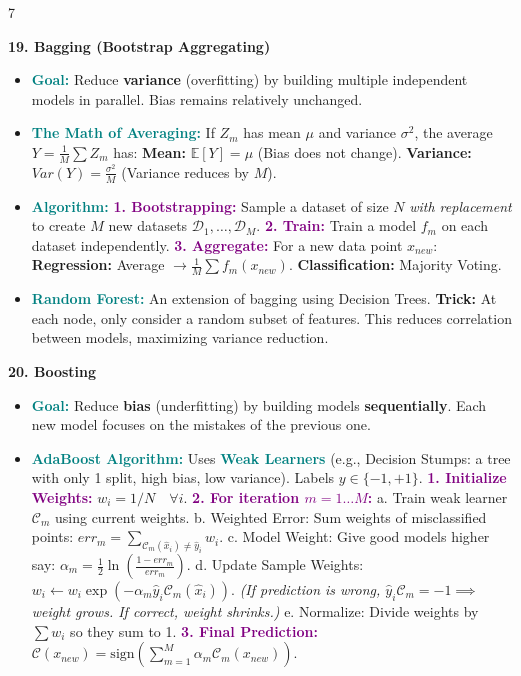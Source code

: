 \documentclass{article}
\newcommand{\hlhighlight}[1]{\par\vspace{1.5pt}\noindent\colorbox{yellow!50}{\parbox{\dimexpr\columnwidth-2\fboxsep\relax}{\textbf{#1}}}\par\vspace{0.5pt}}
\newcommand{\sectitle}[1]{\par\textbf{\color{blue!70!black}{#1}}\par}
\newcommand{\concept}[1]{\textcolor{teal}{\textbf{#1}}}
\newcommand{\procname}[1]{\textcolor{purple}{\textbf{#1}}}
\newcommand{\lbl}[1]{\textcolor{green!60!black}{\textbf{#1}}}
\newcommand{\lblnb}[1]{\textcolor{green!60!black}{#1}}
\begin{document}
\begin{multicols}{7}
\hlhighlight{19. Bagging (Bootstrap Aggregating)}
\sectitle{Averaging \& Algorithms}
\begin{itemize}
    \item \concept{Goal:} Reduce \lbl{variance} (overfitting) by building multiple independent models in parallel. Bias remains relatively unchanged.
    \item \concept{The Math of Averaging:} If $Z_m$ has mean $\mu$ and variance $\sigma^2$, the average $Y = \frac{1}{M}\sum Z_m$ has: \lbl{Mean:} $\mathbb{E}[Y] = \mu$ (Bias does not change). \lbl{Variance:} $Var(Y) = \frac{\sigma^2}{M}$ (Variance reduces by $M$).
    \item \concept{Algorithm:} \procname{1. Bootstrapping:} Sample a dataset of size $N$ \textit{with replacement} to create $M$ new datasets $\mathcal{D}_1, \dots, \mathcal{D}_M$. \procname{2. Train:} Train a model $f_m$ on each dataset independently. \procname{3. Aggregate:} For a new data point $x_{new}$: \lbl{Regression:} Average $\rightarrow \frac{1}{M}\sum f_m(x_{new})$. \lbl{Classification:} Majority Voting.
    \item \concept{Random Forest:} An extension of bagging using Decision Trees. \lbl{Trick:} At each node, only consider a random subset of features. This reduces correlation between models, maximizing variance reduction.
\end{itemize}

\hlhighlight{20. Boosting}
\sectitle{AdaBoost Algorithm (Binary)}
\begin{itemize}
    \item \concept{Goal:} Reduce \lbl{bias} (underfitting) by building models \lbl{sequentially}. Each new model focuses on the mistakes of the previous one.
    \item \concept{AdaBoost Algorithm:} Uses \concept{Weak Learners} (e.g., Decision Stumps: a tree with only 1 split, high bias, low variance). Labels $y \in \{-1, +1\}$. \procname{1. Initialize Weights:} $w_i = 1/N \quad \forall i$. \procname{2. For iteration $m = 1 \dots M$:} \lblnb{a.} Train weak learner $\mathcal{C}_m$ using current weights. \lblnb{b. Weighted Error:} Sum weights of misclassified points: $err_m = \sum_{\mathcal{C}_m(\hat{x}_i) \neq \hat{y}_i} w_i$. \lblnb{c. Model Weight:} Give good models higher say: $\alpha_m = \frac{1}{2} \ln \left( \frac{1 - err_m}{err_m} \right)$. \lblnb{d. Update Sample Weights:} $w_i \leftarrow w_i \exp(-\alpha_m \hat{y}_i \mathcal{C}_m(\hat{x}_i))$. \textit{(If prediction is wrong, $\hat{y}_i \mathcal{C}_m = -1 \implies$ weight grows. If correct, weight shrinks.)} \lblnb{e. Normalize:} Divide weights by $\sum w_i$ so they sum to 1. \procname{3. Final Prediction:} $\mathcal{C}(x_{new}) = \text{sign}\left(\sum_{m=1}^M \alpha_m \mathcal{C}_m(x_{new})\right)$.
\end{itemize}


\end{multicols}
\end{document}
